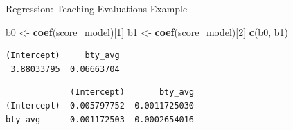 \documentclass[
  ignorenonframetext,
]{beamer}
\newenvironment{Shaded}{\begin{snugshade}}{\end{snugshade}}
\newcommand{\DecValTok}[1]{\textcolor[rgb]{0.00,0.00,0.81}{#1}}
\newcommand{\FunctionTok}[1]{\textcolor[rgb]{0.13,0.29,0.53}{\textbf{#1}}}
\newcommand{\NormalTok}[1]{#1}
\newcommand{\OtherTok}[1]{\textcolor[rgb]{0.56,0.35,0.01}{#1}}
\newcommand{\SpecialCharTok}[1]{\textcolor[rgb]{0.81,0.36,0.00}{\textbf{#1}}}
\begin{document}
\begin{frame}[fragile]{Regression: Teaching Evaluations Example}
\protect\hypertarget{regression-teaching-evaluations-example-10}{}
\normalsize

\begin{Shaded}
\begin{Highlighting}[]
\NormalTok{b0 }\OtherTok{\textless{}{-}} \FunctionTok{coef}\NormalTok{(score\_model)[}\DecValTok{1}\NormalTok{]}
\NormalTok{b1 }\OtherTok{\textless{}{-}} \FunctionTok{coef}\NormalTok{(score\_model)[}\DecValTok{2}\NormalTok{]}
\FunctionTok{c}\NormalTok{(b0, b1)}
\end{Highlighting}
\end{Shaded}

\begin{verbatim}
(Intercept)     bty_avg 
 3.88033795  0.06663704 
\end{verbatim}

\begin{Shaded}
\end{Shaded}

\begin{verbatim}
             (Intercept)       bty_avg
(Intercept)  0.005797752 -0.0011725030
bty_avg     -0.001172503  0.0002654016
\end{verbatim}

\normalsize
\end{frame}
\end{document}
